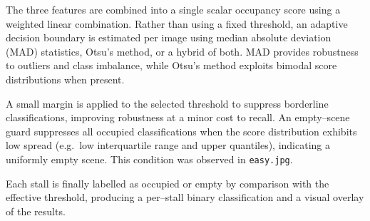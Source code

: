 \documentclass[9pt,journal]{IEEEtran}
\begin{document}
	The three features are combined into a single scalar occupancy score using a weighted linear combination. Rather than using a fixed threshold, an adaptive decision boundary is estimated per image using median absolute deviation (MAD) statistics, Otsu’s method, or a hybrid of both. MAD provides robustness to outliers and class imbalance, while Otsu’s method exploits bimodal score distributions when present.
	
	A small margin is applied to the selected threshold to suppress borderline classifications, improving robustness at a minor cost to recall. An empty--scene guard suppresses all occupied classifications when the score distribution exhibits low spread (e.g.\ low interquartile range and upper quantiles), indicating a uniformly empty scene. This condition was observed in \texttt{easy.jpg}.
	
	Each stall is finally labelled as occupied or empty by comparison with the effective threshold, producing a per--stall binary classification and a visual overlay of the results.
	

	

	
	
	
\end{document}
